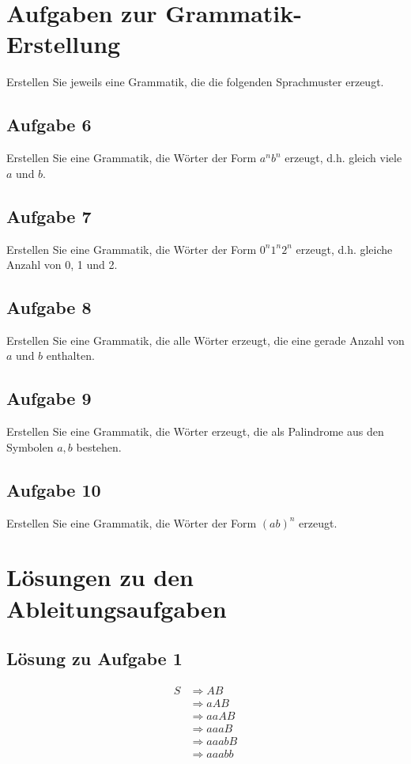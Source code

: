 \documentclass[a4paper,12pt]{article}
\begin{document}
	\newpage
	\section*{Aufgaben zur Grammatik-Erstellung}
	Erstellen Sie jeweils eine Grammatik, die die folgenden Sprachmuster erzeugt.
	
	\subsection*{Aufgabe 6}
	Erstellen Sie eine Grammatik, die Wörter der Form $a^n b^n$ erzeugt, d.h. gleich viele $a$ und $b$.
	
	\subsection*{Aufgabe 7}
	Erstellen Sie eine Grammatik, die Wörter der Form $0^n 1^n 2^n$ erzeugt, d.h. gleiche Anzahl von 0, 1 und 2.
	
	\subsection*{Aufgabe 8}
	Erstellen Sie eine Grammatik, die alle Wörter erzeugt, die eine gerade Anzahl von $a$ und $b$ enthalten.
	
	\subsection*{Aufgabe 9}
	Erstellen Sie eine Grammatik, die Wörter erzeugt, die als Palindrome aus den Symbolen $a, b$ bestehen.
	
	\subsection*{Aufgabe 10}
	Erstellen Sie eine Grammatik, die Wörter der Form $(ab)^n$ erzeugt.
	
	\newpage
	\section*{Lösungen zu den Ableitungsaufgaben}
	
	\subsection*{Lösung zu Aufgabe 1}
	\begin{align*}
		S &\Rightarrow A B \\
		&\Rightarrow a A B \\
		&\Rightarrow a a A B \\
		&\Rightarrow a a a B \\
		&\Rightarrow a a a b B \\
		&\Rightarrow a a a b b
	\end{align*}
	
\end{document}
